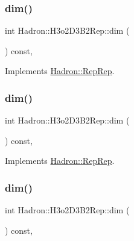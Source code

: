 \subsubsection{\texorpdfstring{dim()}{dim()}\hspace{0.1cm}{\footnotesize\ttfamily [3/5]}}
{\footnotesize\ttfamily int Hadron\+::\+H3o2\+D3\+B2\+Rep\+::dim (\begin{DoxyParamCaption}{ }\end{DoxyParamCaption}) const\hspace{0.3cm}{\ttfamily [inline]}, {\ttfamily [virtual]}}



Implements \mbox{\hyperlink{structHadron_1_1RepRep_a92c8802e5ed7afd7da43ccfd5b7cd92b}{Hadron\+::\+Rep\+Rep}}.

\mbox{\label{structHadron_1_1H3o2D3B2Rep_a95a39ec9eed1e49a38d9caadc2a67ed8}} 
\subsubsection{\texorpdfstring{dim()}{dim()}\hspace{0.1cm}{\footnotesize\ttfamily [4/5]}}
{\footnotesize\ttfamily int Hadron\+::\+H3o2\+D3\+B2\+Rep\+::dim (\begin{DoxyParamCaption}{ }\end{DoxyParamCaption}) const\hspace{0.3cm}{\ttfamily [inline]}, {\ttfamily [virtual]}}



Implements \mbox{\hyperlink{structHadron_1_1RepRep_a92c8802e5ed7afd7da43ccfd5b7cd92b}{Hadron\+::\+Rep\+Rep}}.

\mbox{\label{structHadron_1_1H3o2D3B2Rep_a95a39ec9eed1e49a38d9caadc2a67ed8}} 
\subsubsection{\texorpdfstring{dim()}{dim()}\hspace{0.1cm}{\footnotesize\ttfamily [5/5]}}
{\footnotesize\ttfamily int Hadron\+::\+H3o2\+D3\+B2\+Rep\+::dim (\begin{DoxyParamCaption}{ }\end{DoxyParamCaption}) const\hspace{0.3cm}{\ttfamily [inline]}, {\ttfamily [virtual]}}



